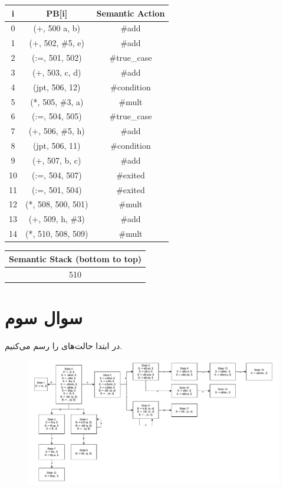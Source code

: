 \documentclass[]{article}
\begin{document}
\begin{latin}
\centering
\begin{tabular}{|c|c|c|}
    \hline
    i & PB[i] & Semantic Action\\
    \hline
    0 & (+, 500 a, b) & \#add\\
    1 & (+, 502, \#5, e) & \#add\\
    2 & (:=, 501, 502) & \#true\_case\\
    3 & (+, 503, c, d) & \#add\\
    4 & (jpt, 506, 12) & \#condition\\
    5 & (*, 505, \#3, a) & \#mult\\
    6 & (:=, 504, 505) & \#true\_case\\
    7 & (+, 506, \#5, h) & \#add\\
    8 & (jpt, 506, 11) & \#condition\\
    9 & (+, 507, b, c) & \#add\\
    10 & (:=, 504, 507) & \#exited\\
    11 & (:=, 501, 504) & \#exited\\
    12 & (*, 508, 500, 501) & \#mult\\
    13 & (+, 509, h, \#3) & \#add\\
    14 & (*, 510, 508, 509) & \#mult\\
    \hline
\end{tabular}
\begin{tabular}{|c|}
    \hline
    Semantic Stack (bottom to top)\\
    \hline
    510\\
    \hline
\end{tabular}
\end{latin}
\section*{سوال سوم}
در ابتدا حالت‌های
را رسم می‌کنیم.
\begin{figure}[h]
    \centering
    \includegraphics[width=1\textwidth]{figure/Q3-LR.pdf}
\end{figure}
\end{document}
